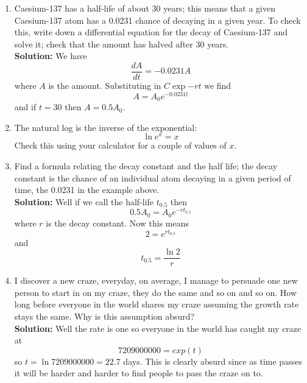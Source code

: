 \documentclass[12pt]{article}
\begin{document}
\begin{enumerate}
\item Caesium-137 has a half-life of about 30 years; this means that a
  given Caesium-137 atom has a 0.0231 chance of decaying in a given
  year. To check this, write down a differential equation for the
  decay of Caesium-137 and solve it; check that the amount has halved
  after 30 years.\\
\textbf{Solution: } We have
\begin{equation}
\frac{dA}{dt}=-0.0231A
\end{equation}
where $A$ is the amount. Substituting in $C\exp{-rt}$ we find
\begin{equation}
A=A_0e^{-0.0231t}
\end{equation}
and if $t=30$ then $A=0.5A_0$.

\item The natural log is the inverse of the exponential:
\begin{equation}
\ln e^x=x
\end{equation}
Check this using your calculator for a couple of values of $x$.


\item Find a formula relating the decay constant and the half life;
  the decay constant is the chance of an individual atom decaying in a
  given period of time, the 0.0231 in the example above.\\
\textbf{Solution: } Well if we call the half-life $t_{0.5}$ then
\begin{equation}
0.5A_0=A_0e^{-rt_{0.5}}
\end{equation}
where $r$ is the decay constant. Now this means
\begin{equation}
2=e^{rt_{0.5}}
\end{equation}
and 
\begin{equation}
t_{0.5}=\frac{\ln{2}}{r}
\end{equation}


\item I discover a new craze, everyday, on average, I manage to
  persuade one new person to start in on my craze, they do the same
  and so on and so on. How long before everyone in the world shares my
  craze assuming the growth rate stays the same. Why is this assumption absurd?\\
\textbf{Solution: } Well the rate is one so everyone in the world has caught my craze at
\begin{equation}
7209000000=exp(t)
\end{equation}
so $t=\ln{7209000000}=22.7$ days. This is clearly absurd since as time passes it will be harder and harder to find people to pass the craze on to.



\end{enumerate}
\end{document}
